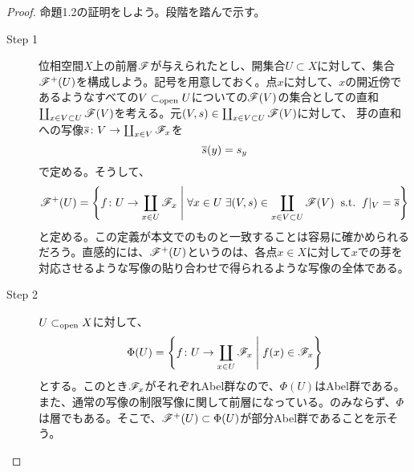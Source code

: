 \begin{proof}
  命題1.2の証明をしよう。段階を踏んで示す。
\begin{description}
  \item[Step 1] 位相空間$X$上の前層$\mathscr{F}$が与えられたとし、開集合$U \subset X$に対して、集合$\mathscr{F}^{+}(U)$を構成しよう。記号を用意しておく。点$x$に対して、$x$の開近傍であるようなすべての$V \subset_{\text{open}} U$についての$\mathscr{F}(V)$の集合としての直和$\coprod_{x \in V \subset U} \mathscr{F}(V)$を考える。元$(V,s) \in \coprod_{x \in V \subset U} \mathscr{F}(V)$に対して、
  芽の直和への写像$\overline{s} \colon V \to \coprod_{x \in V} \mathscr{F}_x$を
  \[
  \overline{s} (y) = s_y
  \]
  で定める。そうして、
  \[
  \mathscr{F}^{+}(U) = \left\{ 
  f \colon U \to \coprod_{x \in U}\mathscr{F}_x
   \mathrel{} \middle| \mathrel{} 
  \forall x \in U \; \exists (V,s) \in \coprod_{x \in V \subset U} \mathscr{F}(V) \; \; \text{s.t.} \; \; f|_{V} = \overline{s}
   \right\}
  \]
  と定める。この定義が本文でのものと一致することは容易に確かめられるだろう。直感的には、$\mathscr{F}^{+}(U)$というのは、各点$x \in X$に対して$x$での芽を対応させるような写像の貼り合わせで得られるような写像の全体である。
\item[Step 2] $U \subset_{\text{open}} X$に対して、
\[
\Phi(U) = \left\{ f \colon U \to \coprod_{x \in U} \mathscr{F}_x     \mathrel{} \middle| \mathrel{}  f(x) \in \mathscr{F}_x      \right\}
\]
とする。このとき$\mathscr{F}_x$がそれぞれAbel群なので、$\Phi(U)$はAbel群である。また、通常の写像の制限写像に関して前層になっている。のみならず、$\Phi$は層でもある。そこで、$\mathscr{F}^{+}(U) \subset \Phi(U)$が部分Abel群であることを示そう。



\end{description}
\end{proof}
